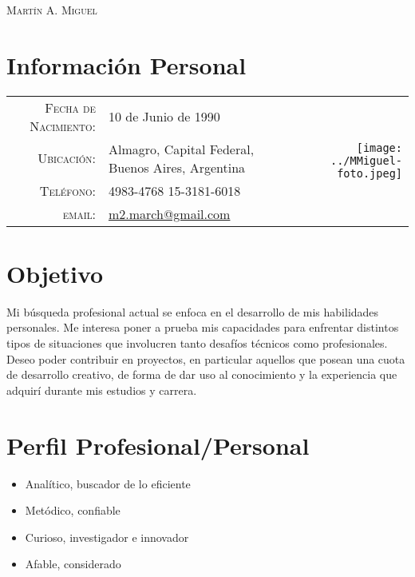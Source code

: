 \documentclass[a4paper,10pt]{article}
\begin{document}
\par{\centering
{\huge{\textsc{Mart\'in A. Miguel}} }
\bigskip\par}

\section{Información Personal}
\begin{tabular}[c]{rp{7.5cm}r}
\textsc{Fecha de Nacimiento:} & 10 de Junio de 1990 & \multirow{4}{*}{\texttt{[image: ../MMiguel-foto.jpeg]}}\\
\textsc{Ubicación:}	& Almagro, Capital Federal, \newline Buenos Aires, Argentina & \\
\textsc{Teléfono:}	& 4983-4768 15-3181-6018 & \\
\textsc{email:}	& \href{mailto:m2.march@gmail.com}{m2.march@gmail.com} & \\

\end{tabular}

\section{Objetivo}
Mi búsqueda profesional actual se enfoca en el desarrollo de mis habilidades personales. Me interesa poner a prueba mis capacidades para enfrentar distintos tipos de situaciones que involucren tanto desafíos técnicos como profesionales. Deseo poder contribuir en proyectos, en particular aquellos que posean una cuota de desarrollo creativo, de forma de dar uso al conocimiento y la experiencia que adquirí durante mis estudios y carrera.

\section{Perfil Profesional/Personal}
\begin{itemize}
 \item Analítico, buscador de lo eficiente %
 \item Metódico, confiable %
 \item Curioso, investigador e innovador %
 \item Afable, considerado %
\end{itemize}
\end{document}
